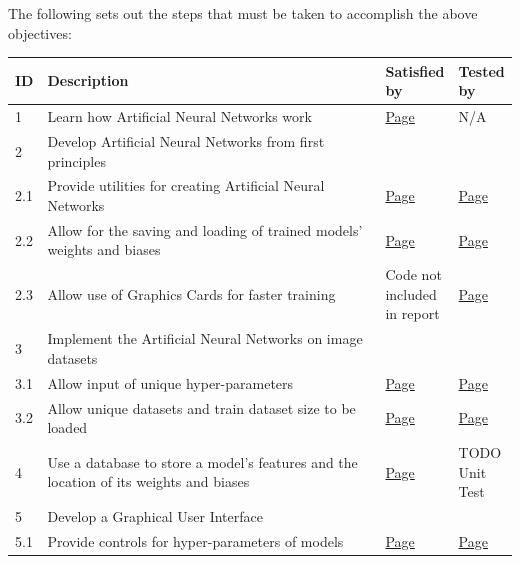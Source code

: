 \documentclass[./project-report/src/latex/project-report.tex]{subfiles}
\begin{document}
The following sets out the steps that must be taken to accomplish the above objectives:

\noindent\begin{tabular}{|p{0.03\linewidth}|p{0.73\linewidth}|p{0.12\linewidth}|p{0.12\linewidth}|}
      \hline
      \textbf{ID} & \textbf{Description} & \textbf{Satisfied by} & \textbf{Tested by} \\
      \hline
      1 & Learn how Artificial Neural Networks work & \hyperref[sec:ann-theory]{Page \pageref{sec:ann-theory}} & N/A \\
      \hline
      2 & Develop Artificial Neural Networks from first principles & & \\
      \hline
      2.1 & Provide utilities for creating Artificial Neural Networks & \hyperref[sec:utils-subpackage]{Page \pageref{sec:utils-subpackage}} & \hyperref[sec:unit-tests]{Page \pageref{sec:unit-tests}} \\
      \hline
      2.2 & Allow for the saving and loading of trained models' weights and biases & \hyperref[sec:model-module]{Page \pageref{sec:model-module}} & \hyperref[sec:unit-tests]{Page \pageref{sec:unit-tests}} \\
      \hline
      2.3 & Allow use of Graphics Cards for faster training & Code not included in report & \hyperref[sec:cpu-vs-gpu-analysis]{Page \pageref{sec:cpu-vs-gpu-analysis}} \\
      \hline
      3 & Implement the Artificial Neural Networks on image datasets & & \\
      \hline
      3.1 & Allow input of unique hyper-parameters & \hyperref[sec:ann-implementations]{Page \pageref{sec:ann-implementations}} & \hyperref[sec:effects-of-hyper-parameters]{Page \pageref{sec:effects-of-hyper-parameters}} \\
      \hline
      3.2 & Allow unique datasets and train dataset size to be loaded & \hyperref[sec:ann-implementations]{Page \pageref{sec:ann-implementations}} & \hyperref[sec:train-dataset-size-analysis]{Page \pageref{sec:train-dataset-size-analysis}} \\
      \hline
      4 & Use a database to store a model's features and the location of its weights and biases & \hyperref[sec:__main__-module]{Page \pageref{sec:__main__-module}} & TODO Unit Test \\
      \hline
      5 & Develop a Graphical User Interface & & \\
      \hline
      5.1 & Provide controls for hyper-parameters of models & \hyperref[sec:create_model-module]{Page \pageref{sec:create_model-module}} & \hyperref[sec:hyper-parameter-frame-input-validation]{Page \pageref{sec:hyper-parameter-frame-input-validation}} \\  %

\end{tabular}
\end{document}

